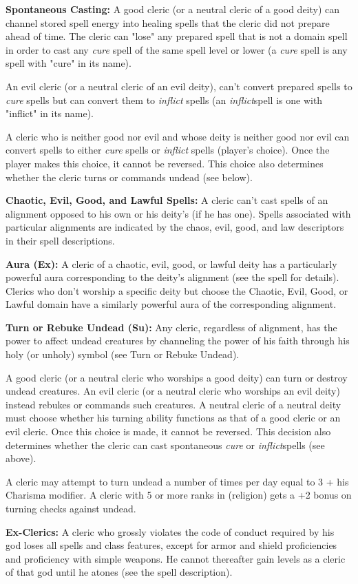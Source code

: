\textbf{Spontaneous Casting:} A good cleric (or a neutral cleric of a good deity) can channel stored spell energy into healing spells that the cleric did not prepare ahead of time. The cleric can "lose" any prepared spell that is not a domain spell in order to cast any \textit{cure} spell of the same spell level or lower (a \textit{cure} spell is any spell with "cure" in its name). 

An evil cleric (or a neutral cleric of an evil deity), can't convert prepared spells to \textit{cure} spells but can convert them to \textit{inflict} spells (an \textit{inflict}spell is one with "inflict" in its name).

A cleric who is neither good nor evil and whose deity is neither good nor evil can convert spells to either \textit{cure} spells or \textit{inflict} spells (player's choice). Once the player makes this choice, it cannot be reversed. This choice also determines whether the cleric turns or commands undead (see below).

\textbf{Chaotic, Evil, Good, and Lawful Spells:} A cleric can't cast spells of an alignment opposed to his own or his deity's (if he has one). Spells associated with particular alignments are indicated by the chaos, evil, good, and law descriptors in their spell descriptions.

\textbf{Aura (Ex):} A cleric of a chaotic, evil, good, or lawful deity has a particularly powerful aura corresponding to the deity's alignment (see the  spell for details). Clerics who don't worship a specific deity but choose the Chaotic, Evil, Good, or Lawful domain have a similarly powerful aura of the corresponding alignment.

\textbf{Turn or Rebuke Undead (Su):} Any cleric, regardless of alignment, has the power to affect undead creatures by channeling the power of his faith through his holy (or unholy) symbol (see Turn or Rebuke Undead).

A good cleric (or a neutral cleric who worships a good deity) can turn or destroy undead creatures. An evil cleric (or a neutral cleric who worships an evil deity) instead rebukes or commands such creatures. A neutral cleric of a neutral deity must choose whether his turning ability functions as that of a good cleric or an evil cleric. Once this choice is made, it cannot be reversed. This decision also determines whether the cleric can cast spontaneous \textit{cure} or \textit{inflict}spells (see above).

A cleric may attempt to turn undead a number of times per day equal to 3 + his Charisma modifier. A cleric with 5 or more ranks in  (religion) gets a +2 bonus on turning checks against undead.

\textbf{Ex-Clerics:} A cleric who grossly violates the code of conduct required by his god loses all spells and class features, except for armor and shield proficiencies and proficiency with simple weapons. He cannot thereafter gain levels as a cleric of that god until he atones (see the  spell description).
